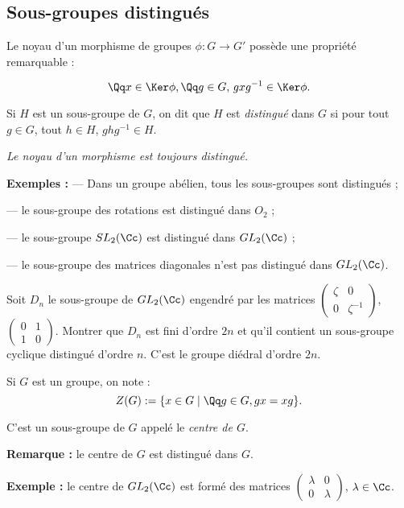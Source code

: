 \documentclass[class=report,crop=false]{standalone}
\newcommand{\GL}{GL}
\newcommand{\SL}{SL}
\begin{document}
\subsection{Sous-groupes distingués}

Le noyau d'un morphisme de groupes $\phi : G \to G'$ possède une propriété remarquable :

\[\Qq x \in \Ker \phi, \Qq g \in G, \, gxg^{-1} \in \Ker \phi .\]

\begin{definition}
Si $H$ est un sous-groupe de $G$, on dit que $H$ est {\it distingué} dans $G$ si pour tout $g \in G$, tout $h \in H$, $ghg^{-1} \in H$. 
\end{definition}

{\it Le noyau d'un morphisme est toujours distingué.}

{\bf Exemples :} --- Dans un groupe abélien, tous les sous-groupes sont distingués ;

--- le sous-groupe des rotations est distingué dans $O_2$ ;

--- le sous-groupe $\SL_2(\Cc)$ est distingué dans $\GL_2(\Cc)$ ;

--- le sous-groupe des matrices diagonales n'est pas distingué dans $\GL_2(\Cc)$.


\begin{exercicecours}
Soit $D_n$ le sous-groupe de $\GL_2(\Cc)$ engendré par les matrices $\left(\begin{array}{cc}
\zeta&0\\
0&\zeta^{-1}
\end{array}\right)$, $\left(\begin{array}{cc}
0&1\\
1&0
\end{array}\right)$. Montrer que $D_n$ est fini d'ordre $2n$ et qu'il contient un sous-groupe cyclique distingué d'ordre  $n$. C'est le groupe diédral d'ordre $2n$.
\end{exercicecours}



\begin{definition}
Si $G$ est un groupe, on note :\[Z(G):=\{x \in G \mid \Qq g \in G, gx=xg\} .\]

C'est un sous-groupe de $G$ appelé le {\it centre de $G$}.
\end{definition}

{\bf Remarque :} le centre de $G$ est distingué dans $G$.

{\bf Exemple :} le centre de $\GL_2(\Cc)$ est formé des matrices $\left(\begin{array}{cc}
\lambda & 0\\
0&\lambda
\end{array}\right)$, $\lambda \in \Cc$.
\end{document}
